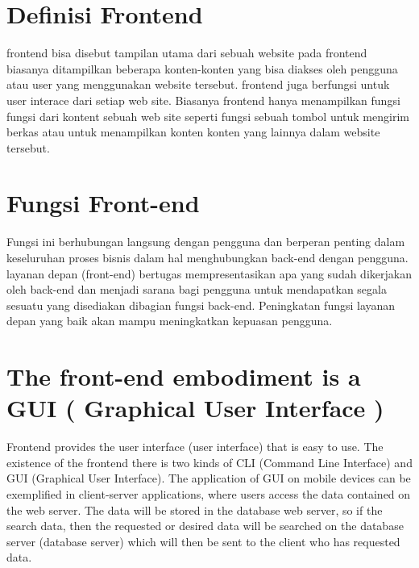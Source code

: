 \section{Definisi Frontend}
frontend bisa disebut tampilan utama dari sebuah website pada frontend biasanya ditampilkan beberapa konten-konten yang bisa diakses oleh pengguna atau user yang menggunakan website tersebut. frontend juga berfungsi untuk user interace dari setiap web site. Biasanya frontend hanya menampilkan fungsi fungsi dari kontent sebuah web site seperti fungsi sebuah tombol untuk mengirim berkas atau untuk menampilkan konten konten yang lainnya dalam website tersebut.

\section{Fungsi Front-end}
Fungsi ini berhubungan langsung dengan pengguna dan berperan penting dalam keseluruhan proses bisnis dalam hal menghubungkan 
back-end dengan pengguna. layanan depan (front-end) bertugas mempresentasikan apa yang sudah dikerjakan oleh back-end
dan menjadi sarana bagi pengguna untuk mendapatkan segala sesuatu yang disediakan dibagian fungsi back-end. Peningkatan fungsi layanan depan yang baik akan mampu meningkatkan kepuasan pengguna.

\section{The front-end embodiment is a GUI ( Graphical User Interface )}
Frontend provides the user interface (user interface) that is easy to use. The existence of the frontend there is two kinds of CLI (Command Line Interface) and GUI (Graphical User Interface). The application of GUI on mobile devices can be exemplified in client-server applications, where users access the data contained on the web server. The data will be stored in the database web server, so if the search data, then the requested or desired data will be searched on the database server (database server) which will then be sent to the client who has requested data.